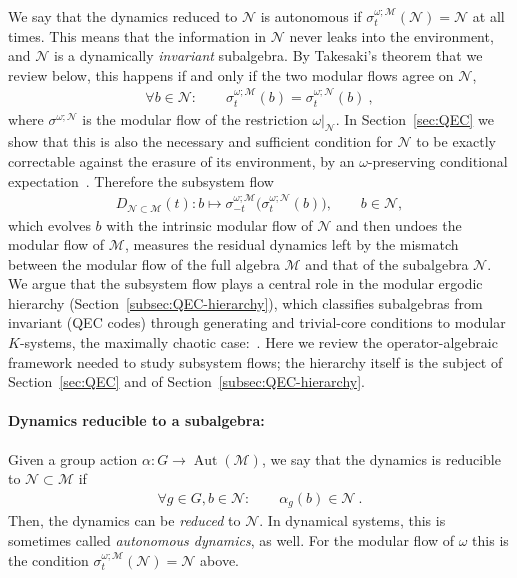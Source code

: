 \documentclass[a4paper,11pt]{article}
\theoremstyle{definition}
\newcommand{\mB}{\mathcal{B}}%
\newcommand{\mN}{\mathcal{N}}
\newcommand{\mH}{\mathcal{H}}
\newcommand{\mM}{\mathcal{M}}
\begin{document}
We say that the dynamics reduced to $\mN$ is autonomous if $\sigma^{\omega;\mM}_t(\mN)=\mN$ at all times. This means that the information in $\mN$ never leaks into the environment, and $\mN$ is a dynamically \emph{invariant} subalgebra. By Takesaki's theorem \cite{Takesaki1972} that we review below, this happens if and only if the two modular flows agree on $\mN$,
\begin{align}
    \forall b\in\mN:\qquad \sigma^{\omega;\mM}_t(b)=\sigma^{\omega;\mN}_t(b)\ ,
\end{align}
where $\sigma^{\omega;\mN}$ is the modular flow of the restriction $\omega|_{\mN}$. In Section~\ref{sec:QEC} we show that this is also the necessary and sufficient condition for $\mN$ to be exactly correctable against the erasure of its environment, by an $\omega$-preserving conditional expectation~\cite{furuya2022real}. Therefore the subsystem flow
\begin{align}
   D_{\mN\subset \mM}(t): b\longmapsto\sigma^{\omega;\mM}_{-t}\bigl(\sigma^{\omega;\mN}_t(b)\bigr),\qquad b\in\mN,
    \label{eq:subsystem-flow-preview}
\end{align}
which evolves $b$ with the intrinsic modular flow of $\mN$ and then undoes the modular flow of $\mM$, measures the residual dynamics left by the mismatch between the modular flow of the full algebra $\mM$ and that of the subalgebra $\mN$. 
We argue that the subsystem flow plays a central role in the modular ergodic hierarchy (Section~\ref{subsec:QEC-hierarchy}), which classifies subalgebras from invariant (QEC codes) through generating and trivial-core conditions to modular $K$-systems, the maximally chaotic case:~\cite{ouseph2024local}.
Here we review the operator-algebraic framework needed to study subsystem flows; the hierarchy itself is the subject of Section~\ref{sec:QEC} and of Section~\ref{subsec:QEC-hierarchy}.

\paragraph{Dynamics reducible to a subalgebra:} Given a group action $\alpha:G\to\operatorname{Aut}(\mM)$, we say that the dynamics is reducible to $\mN\subset\mM$ if
\begin{align}
    \forall g\in G,b\in\mN:\qquad \alpha_g(b)\in \mN\ .
\end{align}
Then, the dynamics can be {\it reduced} to $\mN$. In dynamical systems, this is sometimes called {\it autonomous dynamics}, as well. For the modular flow of $\omega$ this is the condition $\sigma^{\omega;\mM}_t(\mN)=\mN$ above.
\end{document}
